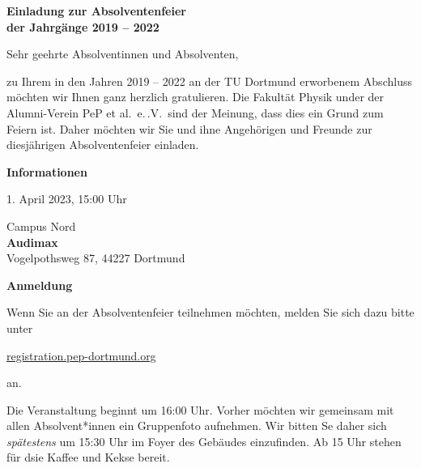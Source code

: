 \documentclass[parskip=half, fontsize=10pt, paper=a5]{scrartcl}
\begin{document}
\raggedright


\begin{center}
\textbf{\Large Einladung zur Absolventenfeier\\ der Jahrgänge 2019 – 2022}
\end{center}
\vspace{0.5cm}

Sehr geehrte Absolventinnen und Absolventen,

zu Ihrem in den Jahren 2019 – 2022 an der TU Dortmund erworbenem Abschluss möchten
wir Ihnen ganz herzlich gratulieren.
Die Fakultät Physik under der Alumni-Verein PeP et al.\ e.\,.V.\ sind der Meinung, dass dies ein Grund zum Feiern ist.
Daher möchten wir Sie und ihne Angehörigen und Freunde zur diesjährigen Absolventenfeier einladen.

\vspace{0.25cm}
\textcolor{tu}{\textbf{\large Informationen}}
\begin{description}[style=multiline, leftmargin=5em]
  \item[Wann] 1. April 2023, 15:00 Uhr
  \item[Wo] Campus Nord\\
    \textbf{Audimax}\\
    Vogelpothsweg 87, 44227 Dortmund
\end{description}

\vspace{0.25cm}
\textcolor{tu}{\textbf{\large Anmeldung}}

Wenn Sie an der Absolventenfeier teilnehmen möchten, melden Sie sich dazu bitte unter
\begin{center}
  \large
  \href{https://registration.pep-dortmund.org/events/absol23/registration}{registration.pep-dortmund.org} 
\end{center}
an.

Die Veranstaltung beginnt um 16:00 Uhr. Vorher möchten wir gemeinsam mit allen Absolvent*innen ein Gruppenfoto aufnehmen.
Wir bitten Se daher sich \emph{spätestens} um 15:30 Uhr im Foyer des Gebäudes einzufinden.
Ab 15 Uhr stehen für dsie Kaffee und Kekse bereit.
\end{document}
